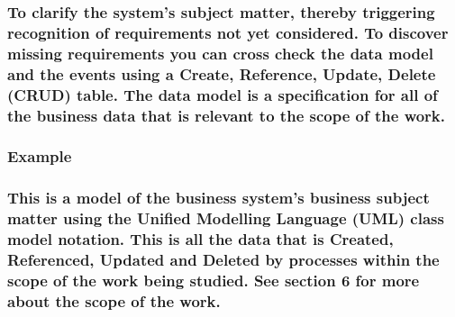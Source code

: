 \documentclass[
]{article}
\begin{document}
\hypertarget{to-clarify-the-systems-subject-matter-thereby-triggering-recognition-of-requirements-not-yet-considered.-to-discover-missing-requirements-you-can-cross-check-the-data-model-and-the-events-using-a-create-reference-update-delete-crud-table.-the-data-model-is-a-specification-for-all-of-the-business-data-that-is-relevant-to-the-scope-of-the-work.}{%
\subsubsection{To clarify the system's subject matter, thereby
triggering recognition of requirements not yet considered. To discover
missing requirements you can cross check the data model and the events
using a Create, Reference, Update, Delete (CRUD) table. The data model
is a specification for all of the business data that is relevant to the
scope of the
work.}\label{to-clarify-the-systems-subject-matter-thereby-triggering-recognition-of-requirements-not-yet-considered.-to-discover-missing-requirements-you-can-cross-check-the-data-model-and-the-events-using-a-create-reference-update-delete-crud-table.-the-data-model-is-a-specification-for-all-of-the-business-data-that-is-relevant-to-the-scope-of-the-work.}}

\hypertarget{example-2}{%
\subsubsection{\texorpdfstring{Example }{Example }}\label{example-2}}

\hypertarget{this-is-a-model-of-the-business-systems-business-subject-matter-using-the-unified-modelling-language-uml-class-model-notation.-this-is-all-the-data-that-is-created-referenced-updated-and-deleted-by-processes-within-the-scope-of-the-work-being-studied.-see-section-6-for-more-about-the-scope-of-the-work.}{%
\subsubsection{This is a model of the business system's business subject
matter using the Unified Modelling Language (UML) class model notation.
This is all the data that is Created, Referenced, Updated and Deleted by
processes within the scope of the work being studied. See section 6 for
more about the scope of the
work.}\label{this-is-a-model-of-the-business-systems-business-subject-matter-using-the-unified-modelling-language-uml-class-model-notation.-this-is-all-the-data-that-is-created-referenced-updated-and-deleted-by-processes-within-the-scope-of-the-work-being-studied.-see-section-6-for-more-about-the-scope-of-the-work.}}
\end{document}
